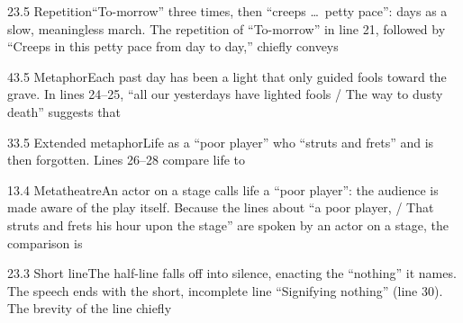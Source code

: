 \documentclass[11pt]{article}
\begin{document}
\begin{q}{2}{3.5 Repetition}{``To-morrow'' three times, then ``creeps \ldots\ petty pace'': days as a slow, meaningless march.}
The repetition of ``To-morrow'' in line 21, followed by ``Creeps in this petty pace from day to day,'' chiefly conveys
\end{q}

\begin{q}{4}{3.5 Metaphor}{Each past day has been a light that only guided fools toward the grave.}
In lines 24--25, ``all our yesterdays have lighted fools / The way to dusty death'' suggests that
\end{q}

\begin{q}{3}{3.5 Extended metaphor}{Life as a ``poor player'' who ``struts and frets'' and is then forgotten.}
Lines 26--28 compare life to
\end{q}

\begin{q}{1}{3.4 Metatheatre}{An actor on a stage calls life a ``poor player'': the audience is made aware of the play itself.}
Because the lines about ``a poor player, / That struts and frets his hour upon the stage'' are spoken by an actor on a stage, the comparison is
\end{q}

\begin{q}{2}{3.3 Short line}{The half-line falls off into silence, enacting the ``nothing'' it names.}
The speech ends with the short, incomplete line ``Signifying nothing'' (line 30). The brevity of the line chiefly
\end{q}
\end{document}
